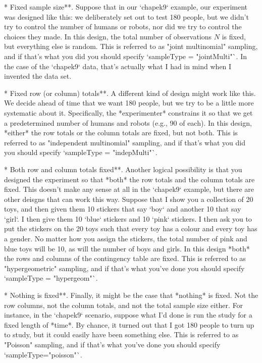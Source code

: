 \item ** Fixed sample size**. Suppose that in our `chapek9` example, our experiment was designed like this: we deliberately set out to test 180 people, but we didn't try to control the number of humans or robots, nor did we try to control the choices they made. In this design, the total number of observations $N$ is fixed, but everything else is random. This is referred to as "joint multinomial" sampling, and if that's what you did you should specify `sampleType = "jointMulti"`. In the case of the `chapek9` data, that's actually what I had in mind when I invented the data set.
\item ** Fixed row (or column) totals**. A different kind of design might work like this. We decide ahead of time that we want 180 people, but we try to be a little more systematic about it. Specifically, the *experimenter* constrains it so that we get a predetermined number of humans and robots (e.g., 90 of each). In this design, *either* the row totals or the column totals are fixed, but not both. This is referred to as "independent multinomial" sampling, and if that's what you did you should specify `sampleType = "indepMulti"`. 
\item ** Both row and column totals fixed**. Another logical possibility is that you designed the experiment so that *both* the row totals and the column totals are fixed. This doesn't make any sense at all in the `chapek9` example, but there are other deisgns that can work this way. Suppose that I show you a collection of 20 toys, and then given them 10 stickers that say `boy` and another 10 that say `girl`. I then give them 10 `blue` stickers and 10 `pink` stickers. I then ask you to put the stickers on the 20 toys such that every toy has a colour and every toy has a gender. No matter how you assign the stickers, the total number of pink and blue toys will be 10, as will the number of boys and girls. In this design *both* the rows and columns of the contingency table are fixed. This is referred to as "hypergeometric" sampling, and if that's what you've done you should specify `sampleType = "hypergeom"`.
\item ** Nothing is fixed**. Finally, it might be the case that *nothing* is fixed. Not the row columns, not the column totals, and not the total sample size either. For instance, in the `chapek9` scenario, suppose what I'd done is run the study for a fixed length of *time*. By chance, it turned out that I got 180 people to turn up to study, but it could easily have been something else. This is referred to as "Poisson" sampling, and if that's what you've done you should specify `sampleType="poisson"`.




